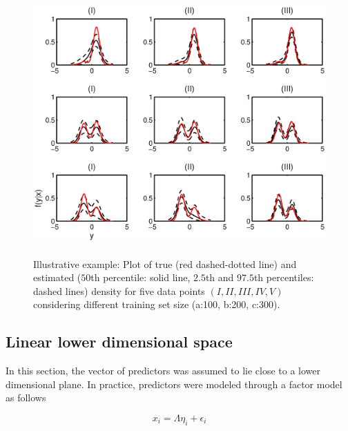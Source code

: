 \begin{figure}[h!]
\centering
\includegraphics[width=120mm,height=100mm]{ch3_density.eps}
\caption{Illustrative example: Plot of true (red dashed-dotted line) and estimated ($50$th percentile: solid line, $2.5$th and $97.5$th percentiles: dashed lines) density for five data points $(I, II,III, IV, V)$ considering different training set size (a:100, b:200, c:300). } \label{plotDensity}
\end{figure}



\subsection{Linear lower dimensional space} \label{section:linear}

In this section, the vector of predictors was assumed to lie close to a lower dimensional plane. In practice,  predictors were modeled through a factor model as follows 

\begin{equation} x_i=\Lambda \eta_i + \epsilon_i \end{equation} 

